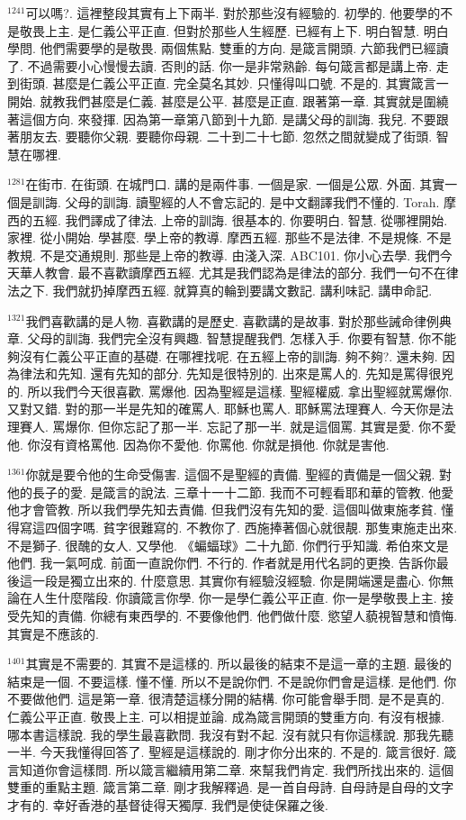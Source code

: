 \documentclass{book}
\begin{document}
$^{1241}$可以嗎?.
這裡整段其實有上下兩半.
對於那些沒有經驗的.
初學的.
他要學的不是敬畏上主.
是仁義公平正直.
但對於那些人生經歷.
已經有上下.
明白智慧.
明白學問.
他們需要學的是敬畏.
兩個焦點.
雙重的方向.
是箴言開頭.
六節我們已經讀了.
不過需要小心慢慢去讀.
否則的話.
你一是非常熟齡.
每句箴言都是講上帝.
走到街頭.
甚麼是仁義公平正直.
完全莫名其妙.
只懂得叫口號.
不是的.
其實箴言一開始.
就教我們甚麼是仁義.
甚麼是公平.
甚麼是正直.
跟著第一章.
其實就是圍繞著這個方向.
來發揮.
因為第一章第八節到十九節.
是講父母的訓誨.
我兒.
不要跟著朋友去.
要聽你父親.
要聽你母親.
二十到二十七節.
忽然之間就變成了街頭.
智慧在哪裡.

$^{1281}$在街市.
在街頭.
在城門口.
講的是兩件事.
一個是家.
一個是公眾.
外面.
其實一個是訓誨.
父母的訓誨.
讀聖經的人不會忘記的.
是中文翻譯我們不懂的.
Torah.
摩西的五經.
我們譯成了律法.
上帝的訓誨.
很基本的.
你要明白.
智慧.
從哪裡開始.
家裡.
從小開始.
學甚麼.
學上帝的教導.
摩西五經.
那些不是法律.
不是規條.
不是教規.
不是交通規則.
那些是上帝的教導.
由淺入深.
ABC101.
你小心去學.
我們今天華人教會.
最不喜歡讀摩西五經.
尤其是我們認為是律法的部分.
我們一句不在律法之下.
我們就扔掉摩西五經.
就算真的輪到要講文數記.
講利味記.
講申命記.

$^{1321}$我們喜歡講的是人物.
喜歡講的是歷史.
喜歡講的是故事.
對於那些誡命律例典章.
父母的訓誨.
我們完全沒有興趣.
智慧提醒我們.
怎樣入手.
你要有智慧.
你不能夠沒有仁義公平正直的基礎.
在哪裡找呢.
在五經上帝的訓誨.
夠不夠?.
還未夠.
因為律法和先知.
還有先知的部分.
先知是很特別的.
出來是罵人的.
先知是罵得很兇的.
所以我們今天很喜歡.
罵爆他.
因為聖經是這樣.
聖經權威.
拿出聖經就罵爆你.
又對又錯.
對的那一半是先知的確罵人.
耶穌也罵人.
耶穌罵法理賽人.
今天你是法理賽人.
罵爆你.
但你忘記了那一半.
忘記了那一半.
就是這個罵.
其實是愛.
你不愛他.
你沒有資格罵他.
因為你不愛他.
你罵他.
你就是損他.
你就是害他.

$^{1361}$你就是要令他的生命受傷害.
這個不是聖經的責備.
聖經的責備是一個父親.
對他的長子的愛.
是箴言的說法.
三章十一十二節.
我而不可輕看耶和華的管教.
他愛他才會管教.
所以我們學先知去責備.
但我們沒有先知的愛.
這個叫做東施孝貧.
懂得寫這四個字嗎.
貧字很難寫的.
不教你了.
西施捧著個心就很靚.
那隻東施走出來.
不是獅子.
很醜的女人.
又學他.
《蝙蝠球》二十九節.
你們行乎知識.
希伯來文是他們.
我一氣呵成.
前面一直說你們.
不行的.
作者就是用代名詞的更換.
告訴你最後這一段是獨立出來的.
什麼意思.
其實你有經驗沒經驗.
你是開端還是盡心.
你無論在人生什麼階段.
你讀箴言你學.
你一是學仁義公平正直.
你一是學敬畏上主.
接受先知的責備.
你總有東西學的.
不要像他們.
他們做什麼.
慾望人藐視智慧和憤悔.
其實是不應該的.

$^{1401}$其實是不需要的.
其實不是這樣的.
所以最後的結束不是這一章的主題.
最後的結束是一個.
不要這樣.
懂不懂.
所以不是說你們.
不是說你們會是這樣.
是他們.
你不要做他們.
這是第一章.
很清楚這樣分開的結構.
你可能會舉手問.
是不是真的.
仁義公平正直.
敬畏上主.
可以相提並論.
成為箴言開頭的雙重方向.
有沒有根據.
哪本書這樣說.
我的學生最喜歡問.
我沒有對不起.
沒有就只有你這樣說.
那我先聽一半.
今天我懂得回答了.
聖經是這樣說的.
剛才你分出來的.
不是的.
箴言很好.
箴言知道你會這樣問.
所以箴言繼續用第二章.
來幫我們肯定.
我們所找出來的.
這個雙重的重點主題.
箴言第二章.
剛才我解釋過.
是一首自母詩.
自母詩是自母的文字才有的.
幸好香港的基督徒得天獨厚.
我們是使徒保羅之後.
\end{document}
